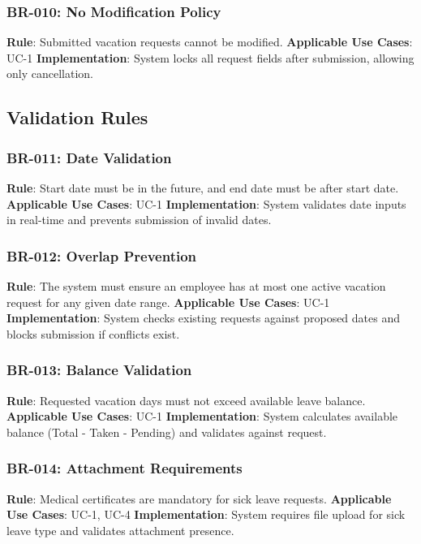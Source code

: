 \documentclass[12pt,a4paper]{article}
\begin{document}
\subsubsection{BR-010: No Modification Policy}
\textbf{Rule}: Submitted vacation requests cannot be modified.
\textbf{Applicable Use Cases}: UC-1
\textbf{Implementation}: System locks all request fields after submission, allowing only cancellation.

\subsection{Validation Rules}

\subsubsection{BR-011: Date Validation}
\textbf{Rule}: Start date must be in the future, and end date must be after start date.
\textbf{Applicable Use Cases}: UC-1
\textbf{Implementation}: System validates date inputs in real-time and prevents submission of invalid dates.

\subsubsection{BR-012: Overlap Prevention}
\textbf{Rule}: The system must ensure an employee has at most one active vacation request for any given date range.
\textbf{Applicable Use Cases}: UC-1
\textbf{Implementation}: System checks existing requests against proposed dates and blocks submission if conflicts exist.

\subsubsection{BR-013: Balance Validation}
\textbf{Rule}: Requested vacation days must not exceed available leave balance.
\textbf{Applicable Use Cases}: UC-1
\textbf{Implementation}: System calculates available balance (Total - Taken - Pending) and validates against request.

\subsubsection{BR-014: Attachment Requirements}
\textbf{Rule}: Medical certificates are mandatory for sick leave requests.
\textbf{Applicable Use Cases}: UC-1, UC-4
\textbf{Implementation}: System requires file upload for sick leave type and validates attachment presence.
\end{document}
